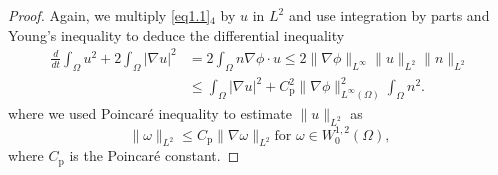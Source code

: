 \documentclass[reqno]{amsart}
\begin{document}
\begin{proof}
Again, we multiply \eqref{eq1.1}$_4$ by $u$ in $L^2$ and use integration by parts 
and Young's inequality to deduce the differential inequality
\begin{equation}\label{eq-3.23}
\begin{aligned}
\frac{d}{dt} \int_{\Omega} u^2 + 2\int_{\Omega} |\nabla u|^2
&= 2\int_{\Omega} n \nabla \phi \cdot u\leq 2\|\nabla\phi\|_{L^\infty}\|u\|_{L^2}\|n\|_{L^2}
\\
& \leq \int_\Omega |\nabla u|^2 + C_{\mathrm{p}}^2\|\nabla\phi\|^2_{L^{\infty}(\Omega)}
\int_\Omega n^2. 
\end{aligned}
\end{equation}
where we used Poincar\'e inequality to estimate $\|u\|_{L^2}$ as
$$
\|\omega\|_{L^2}\leq C_{\mathrm{p}}\|\nabla \omega\|_{L^2}\text{for } 
\omega\in W^{1,2}_0(\Omega),
$$
where $C_{\mathrm{p}}$ is the Poincar\'e constant.


\end{proof}
\end{document}
